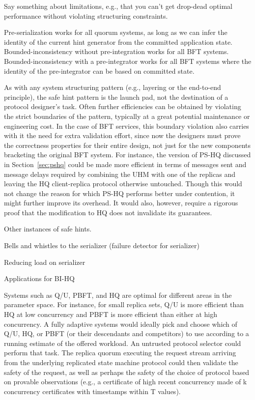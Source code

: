 \documentclass[twocolumn,10pt]{article}
\newcommand{\bihq}{BI-HQ\xspace}
\newcommand{\stitle}[1]{\vspace{2pt}{\bf #1:}}
\begin{document}
\stitle{Limitations?} Say something about limitations, e.g., that you
can't get drop-dead optimal performance without violating structuring
constraints.

\stitle{Trick applicability} Pre-serialization works for all quorum
systems, as long as we can infer the identity of the current
hint generator from the committed application state.
Bounded-inconsistency without pre-integration works for all BFT
systems.  Bounded-inconsistency with a pre-integrator works for all BFT
systems where the identity of the pre-integrator can be based on
committed state.


\stitle{Patterns and Reality} As with any system structuring pattern
(e.g., layering or the end-to-end principle), the safe hint pattern is
the launch pad, not the destination of a protocol designer's task.
Often further efficiencies can be obtained by violating the strict
boundaries of the pattern, typically at a great potential maintenance or
engineering cost.  In the case of BFT services, this boundary violation
also carries with it the need for extra validation effort, since now the
designers must prove the correctness properties for their entire design,
not just for the new components bracketing the original BFT system.  For
instance, the version of PS-HQ discussed in Section~\ref{sec:pshq} could
be made more efficient in terms of messages sent and message delays
required by combining the UHM with one of the replicas and leaving the
HQ client-replica protocol otherwise untouched.  Though this would not
change the reason for which PS-HQ performs better under contention, it
might further improve its overhead.  It would also, however, require a
rigorous proof that the modification to HQ does not invalidate its
guarantees.


\stitle{Further applicability} Other instances of safe hints.

Bells and whistles to the serializer (failure detector for
serializer)

Reducing load on serializer

Applications for \bihq

Systems such as Q/U, PBFT, and HQ are optimal for different areas
in the parameter space. For instance, for small replica sets, Q/U is
more efficient than HQ at low concurrency and PBFT is more efficient
than either at high concurrency. A fully adaptive systems would ideally
pick and choose which of Q/U, HQ, or PBFT (or their descendants and
competitors) to use according to a running estimate of the offered
workload. An untrusted protocol selector could perform that task. The
replica quorum executing the request stream arriving from the underlying
replicated state machine protocol could then validate the safety of the
request, as well as perhaps the safety of the choice of protocol based
on provable observations (e.g., a certificate of high recent concurrency
made of k concurrency certificates with timestamps within T values).
\end{document}
